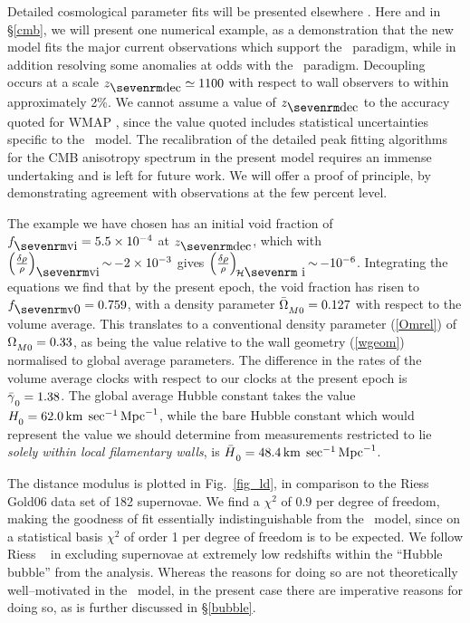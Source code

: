\documentclass[12pt]{article}
\begin{document}
Detailed cosmological parameter fits will be presented elsewhere
\cite{paper2}. Here and in \S\ref{cmb}, we will present one numerical
example, as a demonstration that the new model fits the major current
observations which support the \LCDM\ paradigm, while in addition resolving
some anomalies at odds with the \LCDM\ paradigm.
Decoupling occurs at a scale $\zdec\simeq1100$ with respect to wall observers
to within approximately 2\%. We cannot assume a value of $\zdec$ to the
accuracy quoted for WMAP \cite{wmap}, since the value quoted
includes statistical uncertainties specific to the \LCDM\ model. The
recalibration of the detailed peak fitting algorithms for the CMB anisotropy
spectrum in the present model requires an immense undertaking and is left for
future work. We will offer a proof of principle, by demonstrating agreement
with observations at the few percent level.

The example we have chosen has an initial void fraction of $\fvi=5.5\times
10^{-4}$ at $\zdec$, which with $\left(\de\rh\over\rh\right)\ns{vi}\goesas
-2\times10^{-3}$ gives
$\left(\de\rh\over\rh\right)_{\!\cal H\hbox{\sevenrm i}}\goesas-10^{-6}$.
Integrating the equations we find that by the present epoch, the void
fraction has risen to $f\ns{v0}=0.759$, with a density parameter
$\OMMn=0.127$ with respect to the volume average. This translates to
a conventional density parameter (\ref{Omrel}) of $\OmMn=0.33$, as
being the value relative to the wall geometry (\ref{wgeom}) normalised
to global average parameters. The difference in the rates of
the volume average clocks with respect to our clocks at the present
epoch is $\gc=1.38$. The global average Hubble constant takes the value
$\Hm=62.0\kmsMpc$, while the bare Hubble constant which would represent
the value we should determine from measurements restricted to lie
{\em solely within local filamentary walls}, is $\Hb=48.4\kmsMpc$.

The distance modulus is plotted in Fig.\ \ref{fig_ld}, in comparison to
the Riess Gold06 data set \cite{Riess06} of 182 supernovae. We find
a $\chi^2$ of $0.9$ per degree of freedom, making the goodness of fit
essentially indistinguishable from the \LCDM\ model, since on a statistical
basis $\chi^2$ of order 1 per degree of freedom is to be expected.
We follow Riess \etal\ \cite{Riess06} in excluding supernovae at extremely
low redshifts within the ``Hubble bubble'' from the analysis. Whereas the
reasons for doing so are not theoretically well--motivated in the \LCDM\
model, in the present case there are imperative reasons for doing so,
as is further discussed in \S\ref{bubble}.
\end{document}

